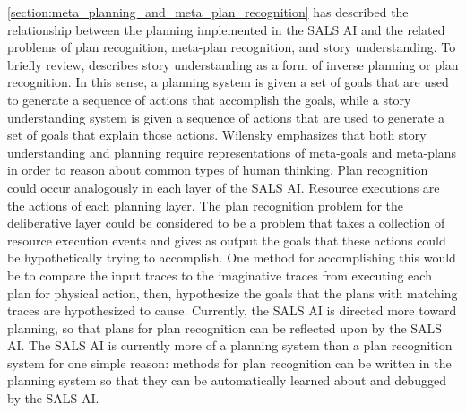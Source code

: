 {\mbox{\autoref{section:meta_planning_and_meta_plan_recognition}}} has
described the relationship between the planning implemented in the
SALS AI and the related problems of plan recognition, meta-plan
recognition, and story understanding.  To briefly review,
\cite{wilensky:1981} describes story understanding as a form of
inverse planning or plan recognition.  In this sense, a planning
system is given a set of goals that are used to generate a sequence of
actions that accomplish the goals, while a story understanding system
is given a sequence of actions that are used to generate a set of
goals that explain those actions.  Wilensky emphasizes that both story
understanding and planning require representations of meta-goals and
meta-plans in order to reason about common types of human thinking.
Plan recognition could occur analogously in each layer of the SALS AI.
Resource executions are the actions of each planning layer.  The plan
recognition problem for the deliberative layer could be considered to
be a problem that takes a collection of resource execution events and
gives as output the goals that these actions could be hypothetically
trying to accomplish.  One method for accomplishing this would be to
compare the input traces to the imaginative traces from executing each
plan for physical action, then, hypothesize the goals that the plans
with matching traces are hypothesized to cause.  Currently, the SALS
AI is directed more toward planning, so that plans for plan
recognition can be reflected upon by the SALS AI.  The SALS AI is
currently more of a planning system than a plan recognition system for
one simple reason: methods for plan recognition can be written in the
planning system so that they can be automatically learned about and
debugged by the SALS AI.


